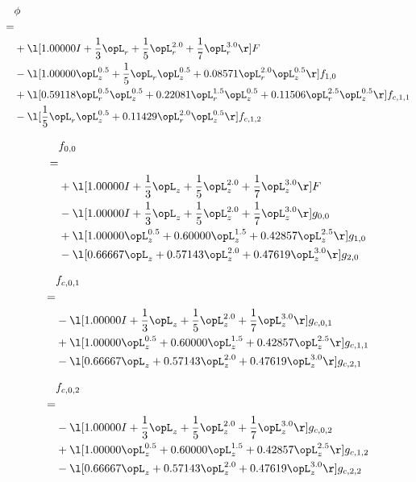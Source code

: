 \begin{alignat}{2} 
\label{eq:scalarFlux_0} 
& \phi \nonumber \\ 
 = \\ 
& + \l[  1.00000 I + \frac{1}{3} \opL_r + \frac{1}{5} \opL_r^{2.0} + \frac{1}{7} \opL_r^{3.0}  \r] F \nonumber \\ 
& - \l[  1.00000 \opL_z^{0.5} + \frac{1}{5} \opL_r \opL_z^{0.5} +  0.08571 \opL_r^{2.0} \opL_z^{0.5}  \r] f_{1,0} \nonumber \\ 
& + \l[  0.59118 \opL_r^{0.5} \opL_z^{0.5} +  0.22081 \opL_r^{1.5} \opL_z^{0.5} +  0.11506 \opL_r^{2.5} \opL_z^{0.5}  \r] f_{c,1,1} \nonumber \\ 
& - \l[ \frac{1}{5} \opL_r \opL_z^{0.5} +  0.11429 \opL_r^{2.0} \opL_z^{0.5}  \r] f_{c,1,2} \nonumber \\ 
\end{alignat} 


\begin{alignat}{2} 
\label{eq:f_00_0} 
& f_{0,0} \nonumber \\ 
 = \\ 
& + \l[  1.00000 I + \frac{1}{3} \opL_z + \frac{1}{5} \opL_z^{2.0} + \frac{1}{7} \opL_z^{3.0}  \r] F \nonumber \\ 
& - \l[  1.00000 I + \frac{1}{3} \opL_z + \frac{1}{5} \opL_z^{2.0} + \frac{1}{7} \opL_z^{3.0}  \r] g_{0,0} \nonumber \\ 
& + \l[  1.00000 \opL_z^{0.5} +  0.60000 \opL_z^{1.5} +  0.42857 \opL_z^{2.5}  \r] g_{1,0} \nonumber \\ 
& - \l[  0.66667 \opL_z +  0.57143 \opL_z^{2.0} +  0.47619 \opL_z^{3.0}  \r] g_{2,0} \nonumber \\ 
\end{alignat} 


\begin{alignat}{2} 
\label{eq:f_01_0} 
& f_{c,0,1} \nonumber \\ 
 = \\ 
& - \l[  1.00000 I + \frac{1}{3} \opL_z + \frac{1}{5} \opL_z^{2.0} + \frac{1}{7} \opL_z^{3.0}  \r] g_{c,0,1} \nonumber \\ 
& + \l[  1.00000 \opL_z^{0.5} +  0.60000 \opL_z^{1.5} +  0.42857 \opL_z^{2.5}  \r] g_{c,1,1} \nonumber \\ 
& - \l[  0.66667 \opL_z +  0.57143 \opL_z^{2.0} +  0.47619 \opL_z^{3.0}  \r] g_{c,2,1} \nonumber \\ 
\end{alignat} 


\begin{alignat}{2} 
\label{eq:f_02_0} 
& f_{c,0,2} \nonumber \\ 
 = \\ 
& - \l[  1.00000 I + \frac{1}{3} \opL_z + \frac{1}{5} \opL_z^{2.0} + \frac{1}{7} \opL_z^{3.0}  \r] g_{c,0,2} \nonumber \\ 
& + \l[  1.00000 \opL_z^{0.5} +  0.60000 \opL_z^{1.5} +  0.42857 \opL_z^{2.5}  \r] g_{c,1,2} \nonumber \\ 
& - \l[  0.66667 \opL_z +  0.57143 \opL_z^{2.0} +  0.47619 \opL_z^{3.0}  \r] g_{c,2,2} \nonumber \\ 
\end{alignat} 


